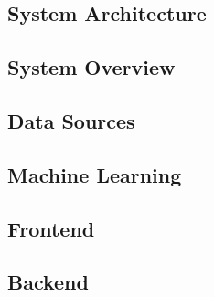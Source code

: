 \documentclass[preview]{standalone}
\begin{document}
\subsection{System Architecture}


\subsection{System Overview}


\subsection{Data Sources}\label{data-sources}


\subsection{Machine Learning}\label{machine-learning}


\subsection{Frontend}\label{frontend}


\subsection{Backend}\label{backend}

\end{document}
